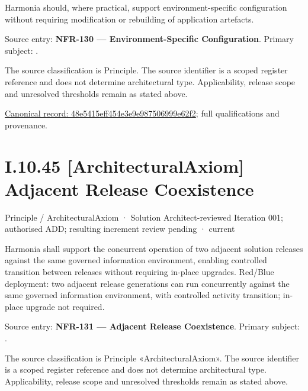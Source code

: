 Harmonia should, where practical, support environment-specific configuration without requiring modification or rebuilding of application artefacts.



Source entry: \textbf{NFR-130 — Environment-Specific Configuration}. Primary subject: \texttt{}.



The source classification is Principle. The source identifier is a scoped register reference and does not determine architectural type. Applicability, release scope and unresolved thresholds remain as stated above.


{\footnotesize \href{../../../../continuum/motivation/principle/48e5415eff454e3e9e987506999e62f2.md}{Canonical record: 48e5415eff454e3e9e987506999e62f2}; full qualifications and provenance.}\par
\section*{I.10.45 [ArchitecturalAxiom] Adjacent Release Coexistence}
\label{navigation:I.10.45}

\label{element:3ce5568f2ded498386fd6fcfb142f89a}
{\small Principle / ArchitecturalAxiom · Solution Architect-reviewed Iteration 001; authorised ADD; resulting increment review pending · current}\par

Harmonia shall support the concurrent operation of two adjacent solution releases against the same governed information environment, enabling controlled transition between releases without requiring in-place upgrades. Red/Blue deployment: two adjacent release generations can run concurrently against the same governed information environment, with controlled activity transition; in-place upgrade not required.



Source entry: \textbf{NFR-131 — Adjacent Release Coexistence}. Primary subject: \texttt{}.



The source classification is Principle «ArchitecturalAxiom». The source identifier is a scoped register reference and does not determine architectural type. Applicability, release scope and unresolved thresholds remain as stated above.


